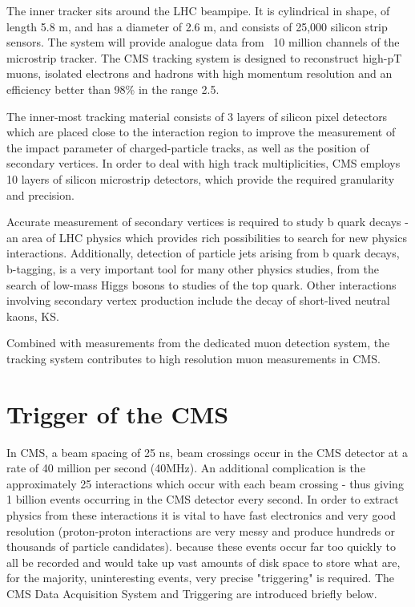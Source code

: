 The inner tracker sits around the LHC beampipe. It is cylindrical in shape, of length 5.8 m, and has a diameter of 2.6 m, and consists of 25,000 silicon strip sensors. The system will provide analogue data from ~10 million channels of the microstrip tracker. The CMS tracking system is designed to reconstruct high-pT muons, isolated electrons and hadrons with high momentum resolution and an efficiency better than 98\% in the range 2.5.

The inner-most tracking material consists of 3 layers of silicon pixel detectors which are placed close to the interaction region to improve the measurement of the impact parameter of charged-particle tracks, as well as the position of secondary vertices. In order to deal with high track multiplicities, CMS employs 10 layers of silicon microstrip detectors, which provide the required granularity and precision.

Accurate measurement of secondary vertices is required to study b quark decays - an area of LHC physics which provides rich possibilities to search for new physics interactions. Additionally, detection of particle jets arising from b quark decays, b-tagging, is a very important tool for many other physics studies, from the search of low-mass Higgs bosons to studies of the top quark. Other interactions involving secondary vertex production include the decay of short-lived neutral kaons, KS.

Combined with measurements from the dedicated muon detection system, the tracking system contributes to high resolution muon measurements in CMS.


\section{Trigger of the CMS}
In CMS, a beam spacing of 25 ns, beam crossings occur in the CMS detector at a rate of 40 million per second (40MHz). 
An additional complication is the approximately 25 interactions which occur with each beam crossing - thus giving 1 billion events occurring in the CMS detector every second. 
In order to extract physics from these interactions it is vital to have fast electronics and very good resolution (proton-proton interactions are very messy and produce hundreds or thousands of particle candidates).
because these events occur far too quickly to all be recorded and would take up vast amounts of disk space to store what are, for the majority, uninteresting events, very precise "triggering" is required. 
The CMS Data Acquisition System and Triggering are introduced briefly below.


